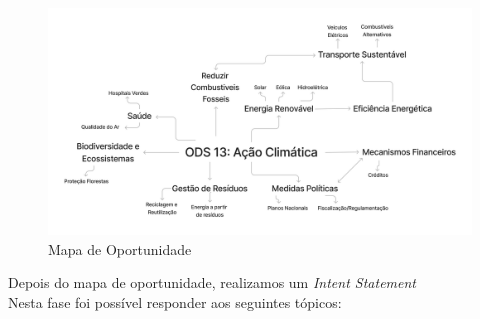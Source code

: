 \documentclass[a4paper, 11pt, onecolumn, oneside]{report}
\begin{document}
\begin{figure}[ht]
    \hspace*{-1.0cm} 
    \includegraphics[scale=0.15]{images/opportunity_map.jpg}
    \caption{Mapa de Oportunidade}
    \label{opportunity_map}
\end{figure}

\newpage

Depois do mapa de oportunidade, realizamos um \textit{Intent Statement}\\ Nesta fase foi possível responder aos seguintes tópicos:
\end{document}
